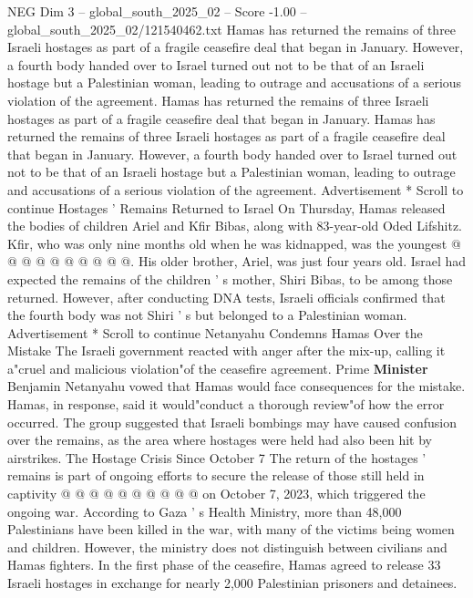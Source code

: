 \begin{textsample}{NEG Dim 3 – global\_south\_2025\_02 – Score -1.00 – global\_south\_2025\_02/121540462.txt}  \label{ex:f3_neg_011}
Hamas has returned the remains of three Israeli hostages as part of a fragile ceasefire deal that began in January.
However, a fourth body handed over to Israel turned out not to be that of an Israeli hostage but a Palestinian woman, leading to outrage and accusations of a serious violation of the agreement.
Hamas has returned the remains of three Israeli hostages as part of a fragile ceasefire deal that began in January.
Hamas has returned the remains of three Israeli hostages as part of a fragile ceasefire deal that began in January.
However, a fourth body handed over to Israel turned out not to be that of an Israeli hostage but a Palestinian woman, leading to outrage and accusations of a serious violation of the agreement.
Advertisement * Scroll to continue Hostages ' Remains Returned to Israel On Thursday, Hamas released the bodies of children Ariel and Kfir Bibas, along with 83-year-old Oded Lifshitz.
Kfir, who was only nine months old when he was kidnapped, was the youngest @ @ @ @ @ @ @ @ @ @.
His older brother, Ariel, was just four years old.
Israel had expected the remains of the children ' s mother, Shiri Bibas, to be among those returned.
However, after conducting DNA tests, Israeli officials confirmed that the fourth body was not Shiri ' s but belonged to a Palestinian woman.
Advertisement * Scroll to continue Netanyahu Condemns Hamas Over the Mistake The Israeli government reacted with anger after the mix-up, calling it a"cruel and malicious violation"of the ceasefire agreement.
Prime \textbf{Minister} Benjamin Netanyahu vowed that Hamas would face consequences for the mistake.
Hamas, in response, said it would"conduct a thorough review"of how the error occurred.
The group suggested that Israeli bombings may have caused confusion over the remains, as the area where hostages were held had also been hit by airstrikes.
The Hostage Crisis Since October 7 The return of the hostages ' remains is part of ongoing efforts to secure the release of those still held in captivity @ @ @ @ @ @ @ @ @ @ on October 7, 2023, which triggered the ongoing war.
According to Gaza ' s Health Ministry, more than 48,000 Palestinians have been killed in the war, with many of the victims being women and children.
However, the ministry does not distinguish between civilians and Hamas fighters.
In the first phase of the ceasefire, Hamas agreed to release 33 Israeli hostages in exchange for nearly 2,000 Palestinian prisoners and detainees.

\end{textsample}
